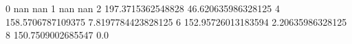 0 nan nan
1 nan nan
2 197.3715362548828 46.620635986328125
4 158.5706787109375 7.8197784423828125
6 152.95726013183594 2.20635986328125
8 150.7509002685547 0.0
